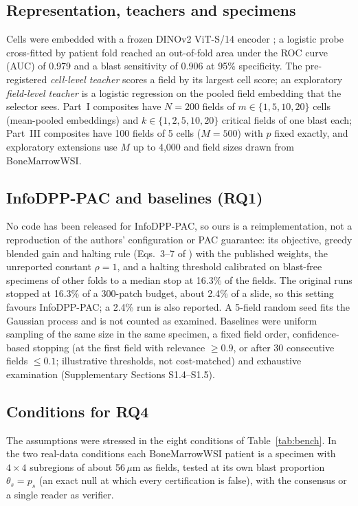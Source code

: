 \documentclass[preprint,12pt]{elsarticle}
\theoremstyle{remark}
\theoremstyle{definition}
\begin{document}
\subsection{Representation, teachers and specimens}
Cells were embedded with a frozen DINOv2 ViT-S/14 encoder \cite{oquab2023dinov2}; a logistic probe cross-fitted by patient fold reached an out-of-fold area under the ROC curve (AUC) of 0.979 and a blast sensitivity of 0.906 at 95\% specificity. The pre-registered \emph{cell-level teacher} scores a field by its largest cell score; an exploratory \emph{field-level teacher} is a logistic regression on the pooled field embedding that the selector sees. Part~I composites have $N=200$ fields of $m\in\{1,5,10,20\}$ cells (mean-pooled embeddings) and $k\in\{1,2,5,10,20\}$ critical fields of one blast each; Part~III composites have 100 fields of 5 cells ($M=500$) with $p$ fixed exactly, and exploratory extensions use $M$ up to 4,000 and field sizes drawn from BoneMarrowWSI.

\subsection{InfoDPP-PAC and baselines (RQ1)}
No code has been released for InfoDPP-PAC, so ours is a reimplementation, not a reproduction of the authors' configuration or PAC guarantee: its objective, greedy blended gain and halting rule (Eqs.~3--7 of \cite{mittal2026infodpp}) with the published weights, the unreported constant $\rho=1$, and a halting threshold calibrated on blast-free specimens of other folds to a median stop at 16.3\% of the fields. The original runs stopped at 16.3\% of a 300-patch budget, about 2.4\% of a slide, so this setting favours InfoDPP-PAC; a 2.4\% run is also reported. A 5-field random seed fits the Gaussian process and is not counted as examined. Baselines were uniform sampling of the same size in the same specimen, a fixed field order, confidence-based stopping (at the first field with relevance $\ge0.9$, or after 30 consecutive fields $\le0.1$; illustrative thresholds, not cost-matched) and exhaustive examination (Supplementary Sections S1.4--S1.5).

\subsection{Conditions for RQ4}
The assumptions were stressed in the eight conditions of Table~\ref{tab:bench}. In the two real-data conditions each BoneMarrowWSI patient is a specimen with $4\times4$ subregions of about 56\,$\mu$m as fields, tested at its own blast proportion $\theta_s=p_s$ (an exact null at which every certification is false), with the consensus or a single reader as verifier.
\end{document}
